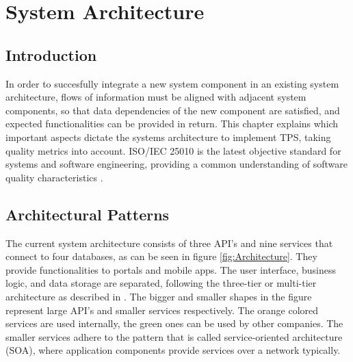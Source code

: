 \graphicspath{{Chapter3/Figs/Vector/}{Chapter3/Figs/}}

%
\chapter{System Architecture}
\section{Introduction}
In order to succesfully integrate a new system component in an existing system architecture, flows of information must be aligned with adjacent system components, so that data dependencies of the new component are satisfied, and expected functionalities can be provided in return. This chapter explains which important aspects dictate the systems architecture to implement TPS, taking quality metrics into account. ISO/IEC 25010 is the latest objective standard for systems and software engineering, providing a common understanding of software quality characteristics \cite{iso-25010}.

%
\section{Architectural Patterns}
The current system architecture consists of three API's and nine services that connect to four databases, as can be seen in figure \ref{fig:Architecture}. They provide functionalities to portals and mobile apps. The user interface, business logic, and data storage are separated, following the three-tier or multi-tier architecture as described in \cite{IBM-3-tier}. The bigger and smaller shapes in the figure represent large API's and smaller services respectively. The orange colored services are used internally, the green ones can be used by other companies. The smaller services adhere to the pattern that is called service-oriented architecture (SOA), where application components provide services over a network typically.


